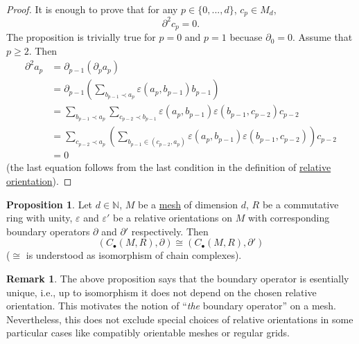 \documentclass[fleqn]{article}
\theoremstyle{definition}
\newtheorem{proposition}[theorem]{Proposition}
\newtheorem{remark}[theorem]{Remark}
\newcommand{\N}{\mathbb{N}}
\begin{document}
\begin{proof}
  It is enough to prove that for any $p \in \{0, ..., d\}$, $c_p \in M_d$,
  \begin{equation}
    \partial^2 c_p = 0. 
  \end{equation}
  The proposition is trivially true for $p = 0$ and $p = 1$
  becuase $\partial_0 = 0$.
  Assume that $p \geq 2$.
  Then
  \begin{equation}
    \begin{split}
      \partial^2 a_p
      & = \partial_{p - 1} (\partial_p a_p) \\
      & = \partial_{p - 1}
      \left(
        \sum_{b_{p - 1} \prec a_p} \varepsilon(a_p, b_{p - 1}) b_{p - 1}
      \right) \\
      & =
      \sum_{b_{p - 1} \prec a_p}
        \sum_{c_{p - 2} \prec b_{p - 1}}
            \varepsilon(a_p, b_{p - 1})
            \varepsilon(b_{p - 1}, c_{p - 2})
            c_{p - 2} \\
      & =
      \sum_{c_{p - 2} \prec a_p}
        \left(
          \sum _{b_{p - 1} \in (c_{p - 2}, a_p)}
            \varepsilon(a_p, b_{p - 1}) \varepsilon(b_{p - 1}, c_{p - 2})
        \right)
        c_{p - 2} \\
      & = 0
    \end{split}
  \end{equation}
  (the last equation follows from the last condition in the definition of
  \hyperref[idec:relative_orientation:definition]{relative orientation}).
\end{proof}

\begin{proposition}
  Let
    $d \in \N$,
    $M$ be a \hyperref[idec:mesh:definition]{mesh} of dimension $d$,
    $R$ be a commutative ring with unity,
    $\varepsilon$ and $\varepsilon'$ be a relative orientations on $M$
      with corresponding boundary operators
      $\partial$ and $\partial'$ respectively.
  Then
  \begin{equation}
    (C_\bullet(M, R), \partial) \cong (C_\bullet(M, R), \partial')
  \end{equation}
  ($\cong$ is understood as isomorphism of chain complexes).
\end{proposition}

\begin{remark}
  The above proposition says that the boundary operator is esentially unique,
  i.e., up to isomorphism it does not depend on the chosen relative orientation.
  This motivates the notion of ``\emph{the} boundary operator'' on a mesh.
  Nevertheless, this does not exclude special choices of relative orientations
  in some particular cases like compatibly orientable meshes or regular grids.
\end{remark}
\end{document}
